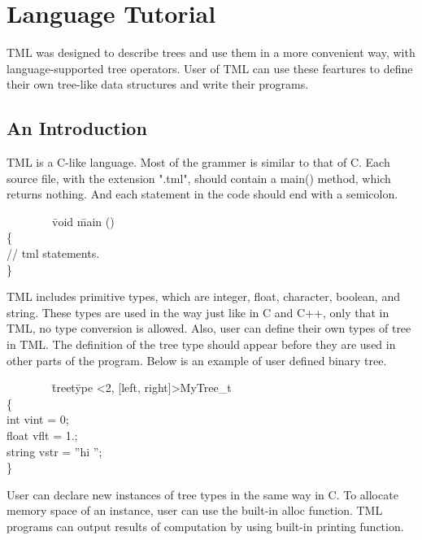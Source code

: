 \documentclass[12pt,psfig,a4]{article}
\begin{document}
\pagebreak
\section{Language Tutorial}
TML was designed to describe trees and use them in a more convenient way, with language-supported tree operators. User of TML can use these feartures to define their own tree-like data structures and write their programs.

\subsection{An Introduction}
TML is a C-like language. Most of the grammer is similar to that of C. Each source file, with the extension ".tml", should contain a main() method, which returns nothing. And each statement in the code should end with a semicolon.

\begin{code}
\begin{tabbing}
~~~~~~~~\= void \=main () \\
\> \{ \\
\> \> // tml statements.\\
\> \}
\end{tabbing}
\end{code}

TML includes primitive types, which are integer, float, character, boolean, and string. These types are used in the way just like in C and C++, only that in TML, no type conversion is allowed. Also, user can define their own types of tree in TML. The definition of the tree type should appear before they are used in other parts of the program. Below is an example of user defined binary tree.

\begin{code}
\begin{tabbing}
~~~~~~~~\= treet\=ype \textless2, [left, right]\textgreater MyTree\_t \\
\> \{ \\
\> \>int vint = 0;\\
\> \>float vflt = 1.;\\
\> \>string vstr = ''hi '';\\
\> \}
\end{tabbing}
\end{code}

User can declare new instances of tree types in the same way in C. To allocate memory space of an instance, user can use the built-in alloc function.
TML programs can output results of computation by using built-in printing function.
\end{document}
